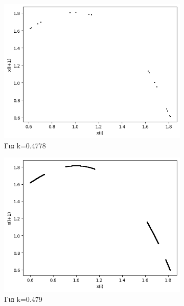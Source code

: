 \begin{figure}[h!]
\begin{subfigure}[b]{0.4\textwidth}
		\includegraphics[width=\textwidth]{LateX images/graphs/k04778}
		\caption{Για k=0.4778}
		\label{f:k5}
	\end{subfigure}
	\hfill
	\begin{subfigure}[b]{0.4\textwidth}
		\centering
		\includegraphics[width=\textwidth]{LateX images/graphs/k0479}
		\caption{Για k=0.479}
		\label{f:k6}
	\end{subfigure}
	\hfill	
	\begin{subfigure}[b]{0.4\textwidth}
		\centering

\end{subfigure}
\end{figure}
